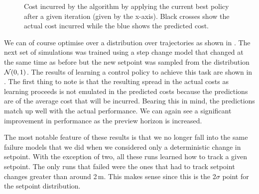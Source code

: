 \begin{figure}
{
\label{fig:cart07}
} 
\caption{Cost incurred by the algorithm by applying the current best policy after a given iteration (given by the x-axis). Black crosses show the actual cost incurred while the blue shows the predicted cost. }
\label{fig:cartcosts2}
\end{figure}


We can of course optimise over a distribution over trajectories as shown in . The next set of simulations was trained using a step change model that changed at the same time as before but the new setpoint was sampled from the distribution $\mathcal{N}(0,1)$. The results of learning a control policy to achieve this task are shown in . The first thing to note is that the resulting spread in the actual costs as learning proceeds is not emulated in the predicted costs because the predictions are of the average cost that will be incurred. Bearing this in mind, the predictions match up well with the actual performance. We can again see a significant improvement in performance as the preview horizon is increased.

The most notable feature of these results is that we no longer fall into the same failure models that we did when we considered only a deterministic change in setpoint. With the exception of two, all these runs learned how to track a given setpoint. The only runs that failed were the ones that had to track setpoint changes greater than around 2$\,$m. This makes sense since this is the 2$\sigma$ point for the setpoint distribution.




